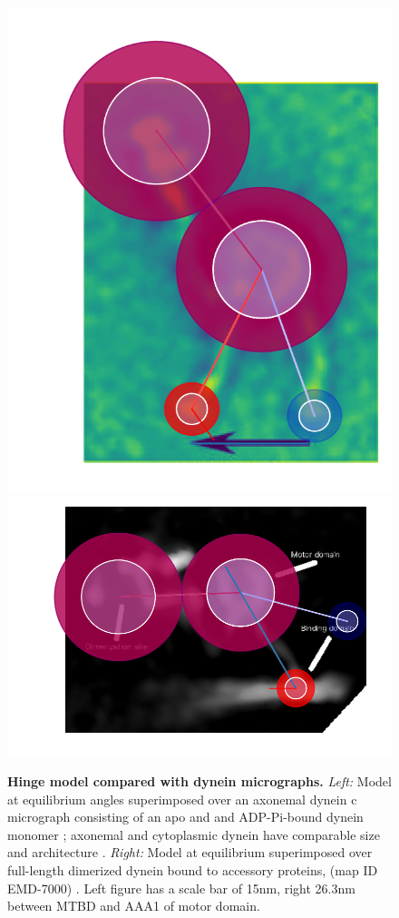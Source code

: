 \documentclass[9pt,twocolumn,twoside]{pnas-new}
\begin{document}
\begin{figure}[tbhp]
\includegraphics[width=0.4\linewidth]{../../plots/burgess-model-figure.pdf}%
\includegraphics[width=0.6\linewidth]{../../plots/grotjahn-model-figure.pdf}%
\caption{\textbf{Hinge model compared with dynein micrographs.} \textit{Left:} Model at equilibrium angles superimposed over an axonemal dynein c micrograph consisting of an apo and and ADP-Pi-bound dynein monomer \cite{burgess-paper}; axonemal and cytoplasmic dynein have comparable size and architecture \cite{dynein-c-paper}. \textit{Right:} Model at equilibrium superimposed over full-length dimerized dynein bound to accessory proteins, (map ID EMD-7000) \cite{grotjahn}. Left figure has a scale bar of 15nm, right 26.3nm between MTBD and AAA1 of motor domain.}
\label{fig:duration-length}
\end{figure}


\end{document}
